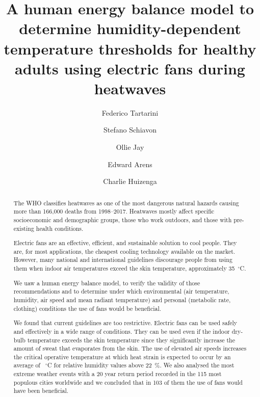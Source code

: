 
\begin{frontmatter}

\title{A human energy balance model to determine humidity-dependent temperature thresholds for healthy adults using electric fans during heatwaves}


\author[sinBerBest]{Federico Tartarini}
\author[CBE]{Stefano Schiavon}
\author[USYD]{Ollie Jay}
\author[CBE]{Edward Arens}
\author[CBE]{Charlie Huizenga}

\address[sinBerBest]{SinBerBEST, Berkeley Education Alliance for Research in Singapore, Singapore}
\address[CBE]{Center for the Built Environment, University of California, Berkeley, USA}
 \address[USYD]{Sydney School of Health Sciences, Faculty of Medicine and Health, The University of Sydney, Sydney, Australia}

\begin{abstract}
    The WHO classifies heatwaves as one of the most dangerous natural hazards causing more than 166,000 deaths from 1998--2017.
    Heatwaves mostly affect specific socioeconomic and demographic groups, those who work outdoors, and those with pre-existing health conditions.
    
    Electric fans are an effective, efficient, and sustainable solution to cool people.
    They are, for most applications, the cheapest cooling technology available on the market.
    However, many national and international guidelines discourage people from using them when indoor air temperatures exceed the skin temperature, approximately 35~$^{\circ}$C\@.
    
    We uaw a human energy balance model, to verify the validity of those recommendations and to determine under which environmental (air temperature, humidity, air speed and mean radiant temperature) and personal (metabolic rate, clothing) conditions the use of fans would be beneficial.
    
    We found that current guidelines are too restrictive.
    Electric fans can be used safely and effectively in a wide range of conditions.
    They can be used even if the indoor dry-bulb temperature exceeds the skin temperature since they significantly increase the amount of sweat that evaporates from the skin.
    The use of elevated air speeds increases the critical operative temperature at which heat strain is expected to occur by an average of ~$^{\circ}$C for relative humidity values above 22~\%\@.
    We also analysed the most extreme weather events with a 20 year return period recorded in the 115 most populous cities worldwide and we concluded that in 103 of them the use of fans would have been beneficial.
    

\end{abstract}
\end{frontmatter}
